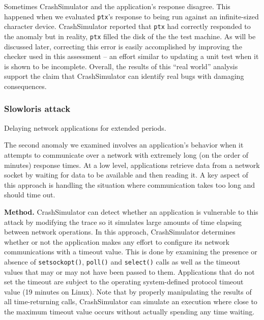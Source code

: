 Sometimes CrashSimulator and the application's response disagree.  This happened
when we evaluated {\tt ptx}'s response to being run against an infinite-sized
character device.  CrashSimulator reported that {\tt ptx} had correctly responded to 
the anomaly but in reality, {\tt ptx} filled the disk of the the test machine.
As will be discussed later, correcting this error is easily accomplished by
improving the checker used in this assessment -- an effort similar to updating
a unit test when it is shown to be incomplete.  Overall, the results of this 
``real world'' analysis support the claim that CrashSimulator can identify real
bugs with damaging consequences.


\subsubsection{Slowloris attack} Delaying network applications for extended
periods.




The second anomaly we examined
involves an application's behavior when it attempts to communicate over a network
with extremely long (on the order of minutes) response times.  At a low level,
applications retrieve data from a network socket by waiting for data to be
available and then reading it.  A key aspect of this approach is handling the 
situation where communication takes too long and should time out.

{\bf Method.}
CrashSimulator can detect whether an application is vulnerable to this attack by
modifying
the trace so it simulates large
amounts of time elapsing between network operations.
In this approach, CrashSimulator determines
whether or not the application makes any effort to configure its network
communications with a timeout value. This is done by examining the presence or
absence of {\tt setsockopt()}, {\tt poll()} and {\tt select()} calls as well as
the timeout values that may or may not have been passed to them. Applications
that do not set the timeout are subject to the operating
system-defined protocol timeout value (19 minutes on Linux).
Note that by properly manipulating the results of all
time-returning calls, CrashSimulator can simulate an execution where close to
the maximum timeout value occurs without actually spending any time
waiting.


